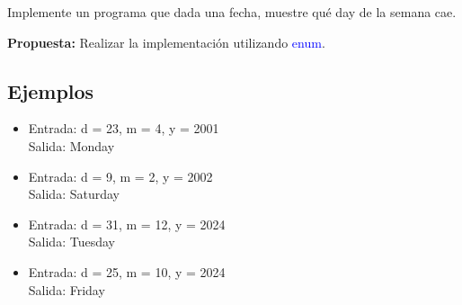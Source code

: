 Implemente un programa que dada una fecha, muestre qué day de la semana cae.

\textbf{Propuesta:} Realizar la implementación utilizando \textcolor{blue}{enum}.

\subsection*{Ejemplos}
\begin{itemize}
    \item Entrada: d = 23, m = 4, y = 2001\\
    Salida: Monday

    \item Entrada: d = 9, m = 2, y = 2002\\
    Salida: Saturday

    \item Entrada: d = 31, m = 12, y = 2024\\
    Salida: Tuesday

    \item Entrada: d = 25, m = 10, y = 2024\\
    Salida: Friday
\end{itemize}

